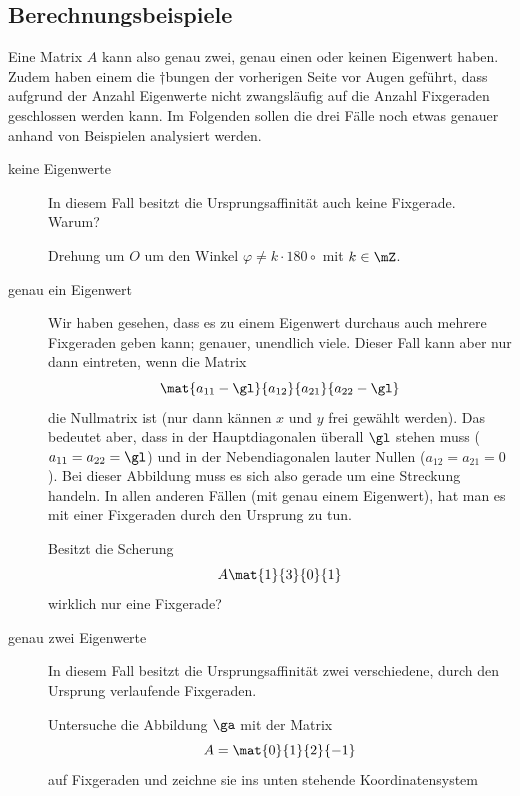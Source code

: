 \documentclass[%
11pt,%
twoside,%
titlepage,%
german,%
headsepline%
]{scrartcl}
\begin{document}
\subsection{Berechnungsbeispiele}

Eine Matrix $A$ kann also genau zwei, genau einen oder keinen Eigenwert haben. Zudem haben einem die †bungen der vorherigen Seite vor Augen geführt, dass aufgrund der Anzahl Eigenwerte nicht zwangsläufig auf die Anzahl Fixgeraden geschlossen werden kann. Im Folgenden sollen die drei Fälle noch etwas genauer anhand von Beispielen analysiert werden.

\begin{description}
\item[keine Eigenwerte] In diesem Fall besitzt die Ursprungsaffinität auch keine Fixgerade. Warum?
\begin{bsp}
Drehung um $O$ um den Winkel $\varphi\neq k\cdot180\circ$ mit $k\in\mZ$.
\end{bsp}
\item[genau ein Eigenwert] Wir haben gesehen, dass es zu einem Eigenwert durchaus auch mehrere Fixgeraden geben kann; genauer, unendlich viele. Dieser Fall kann aber nur dann eintreten, wenn die Matrix
$$\mat{a_{11}-\gl}{a_{12}}{a_{21}}{a_{22}-\gl}$$
die Nullmatrix ist (nur dann kännen $x$ und $y$ frei gewählt werden). Das bedeutet aber, dass in der Hauptdiagonalen überall $\gl$ stehen muss ($a_{11}=a_{22}=\gl$) und in der Nebendiagonalen lauter Nullen ($a_{12}=a_{21}=0$). Bei dieser Abbildung muss es sich also gerade um eine Streckung handeln.
In allen anderen Fällen (mit genau einem Eigenwert), hat man es mit einer Fixgeraden durch den Ursprung zu tun.
\begin{bsp}
Besitzt die Scherung
$$A\mat{1}{3}{0}{1}$$
wirklich nur eine Fixgerade?
\end{bsp}
\item[genau zwei Eigenwerte] In diesem Fall besitzt die Ursprungsaffinität zwei verschiedene, durch den Ursprung verlaufende Fixgeraden.
\begin{bsp}
Untersuche die Abbildung $\ga$ mit der Matrix
$$A=\mat{0}{1}{2}{-1}$$
auf Fixgeraden und zeichne sie ins unten stehende Koordinatensystem
\begin{center}
\end{center}
\end{bsp}


\end{description}
\end{document}

